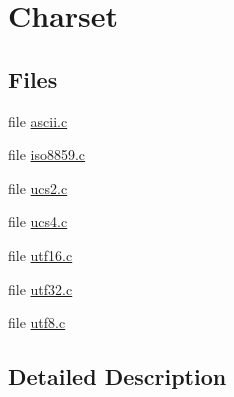 \hypertarget{group__charset}{\section{Charset}
\label{group__charset}
}
\subsection*{Files}
\begin{DoxyCompactItemize}
\item 
file \hyperlink{ascii_8c}{ascii.\-c}
\item 
file \hyperlink{iso8859_8c}{iso8859.\-c}
\item 
file \hyperlink{ucs2_8c}{ucs2.\-c}
\item 
file \hyperlink{ucs4_8c}{ucs4.\-c}
\item 
file \hyperlink{utf16_8c}{utf16.\-c}
\item 
file \hyperlink{utf32_8c}{utf32.\-c}
\item 
file \hyperlink{utf8_8c}{utf8.\-c}
\end{DoxyCompactItemize}


\subsection{Detailed Description}
